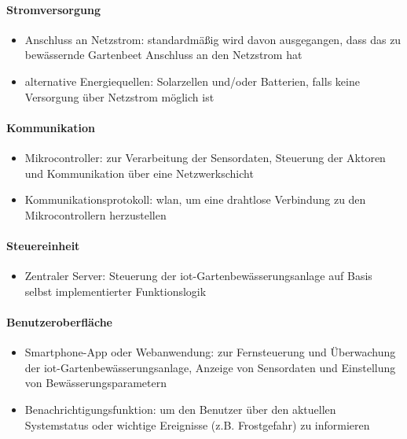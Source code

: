 \paragraph{Stromversorgung}
\begin{itemize}
  \item Anschluss an Netzstrom: standardmäßig wird davon ausgegangen, dass das zu bewässernde Gartenbeet Anschluss an den Netzstrom hat
  \item alternative Energiequellen: Solarzellen und/oder Batterien, falls keine Versorgung über Netzstrom möglich ist
\end{itemize}

\paragraph{Kommunikation}
\begin{itemize}
  \item Mikrocontroller: zur Verarbeitung der Sensordaten, Steuerung der Aktoren und Kommunikation über eine Netzwerkschicht
  \item Kommunikationsprotokoll: \gls{wlan}, um eine drahtlose Verbindung zu den Mikrocontrollern herzustellen
\end{itemize}

\paragraph{Steuereinheit}
\begin{itemize}
  \item Zentraler Server: Steuerung der \gls{iot}-Gartenbewässerungsanlage auf Basis selbst implementierter Funktionslogik
\end{itemize}

\paragraph{Benutzeroberfläche}
\begin{itemize}
  \item Smartphone-App oder Webanwendung: zur Fernsteuerung und Überwachung der \gls{iot}-Gartenbewässerungsanlage, Anzeige von Sensordaten und Einstellung von Bewässerungsparametern
  \item Benachrichtigungsfunktion: um den Benutzer über den aktuellen Systemstatus oder wichtige Ereignisse (z.B. Frostgefahr) zu informieren
\end{itemize}

